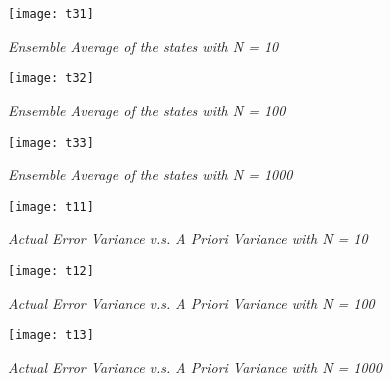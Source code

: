\begin{figure}[H]
	\centering
	\texttt{[image: t31]}
	\caption{\textit{Ensemble Average of the states with N = 10}}
\end{figure}
\begin{figure}[H]
	\centering
	\texttt{[image: t32]}
	\caption{\textit{Ensemble Average of the states with N = 100}}
\end{figure}
\begin{figure}[H]
	\centering
	\texttt{[image: t33]}
	\caption{\textit{Ensemble Average of the states with N = 1000}}
\end{figure}
\begin{figure}[H]
	\centering
	\texttt{[image: t11]}
	\caption{\textit{Actual Error Variance v.s. A Priori Variance with N = 10}}
\end{figure}
\begin{figure}[H]
	\centering
	\texttt{[image: t12]}
	\caption{\textit{Actual Error Variance v.s. A Priori Variance with N = 100}}
\end{figure}
\begin{figure}[H]
	\centering
	\texttt{[image: t13]}
	\caption{\textit{Actual Error Variance v.s. A Priori Variance with N = 1000}}
\end{figure}	